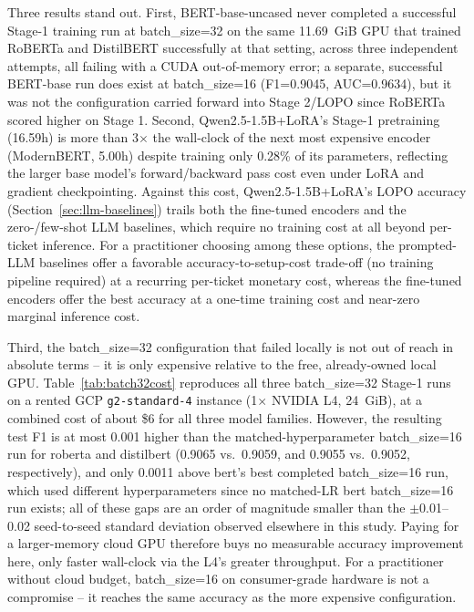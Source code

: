 \documentclass[preprint,12pt]{elsarticle}
\begin{document}
Three results stand out. First, BERT-base-uncased never completed a successful Stage-1 training run at batch\_size=32 on the same 11.69~GiB GPU that trained RoBERTa and DistilBERT successfully at that setting, across three independent attempts, all failing with a CUDA out-of-memory error; a separate, successful BERT-base run does exist at batch\_size=16 (F1=0.9045, AUC=0.9634), but it was not the configuration carried forward into Stage 2/LOPO since RoBERTa scored higher on Stage 1. Second, Qwen2.5-1.5B+LoRA's Stage-1 pretraining (16.59h) is more than 3$\times$ the wall-clock of the next most expensive encoder (ModernBERT, 5.00h) despite training only 0.28\% of its parameters, reflecting the larger base model's forward/backward pass cost even under LoRA and gradient checkpointing. Against this cost, Qwen2.5-1.5B+LoRA's LOPO accuracy (Section~\ref{sec:llm-baselines}) trails both the fine-tuned encoders and the zero-/few-shot LLM baselines, which require no training cost at all beyond per-ticket inference. For a practitioner choosing among these options, the prompted-LLM baselines offer a favorable accuracy-to-setup-cost trade-off (no training pipeline required) at a recurring per-ticket monetary cost, whereas the fine-tuned encoders offer the best accuracy at a one-time training cost and near-zero marginal inference cost.

Third, the batch\_size=32 configuration that failed locally is not out of reach in absolute terms -- it is only expensive relative to the free, already-owned local GPU. Table~\ref{tab:batch32cost} reproduces all three batch\_size=32 Stage-1 runs on a rented GCP \texttt{g2-standard-4} instance (1$\times$ NVIDIA L4, 24~GiB), at a combined cost of about \$6 for all three model families. However, the resulting test F1 is at most 0.001 higher than the matched-hyperparameter batch\_size=16 run for roberta and distilbert (0.9065 vs.\ 0.9059, and 0.9055 vs.\ 0.9052, respectively), and only 0.0011 above bert's best completed batch\_size=16 run, which used different hyperparameters since no matched-LR bert batch\_size=16 run exists; all of these gaps are an order of magnitude smaller than the $\pm$0.01--0.02 seed-to-seed standard deviation observed elsewhere in this study. Paying for a larger-memory cloud GPU therefore buys no measurable accuracy improvement here, only faster wall-clock via the L4's greater throughput. For a practitioner without cloud budget, batch\_size=16 on consumer-grade hardware is not a compromise -- it reaches the same accuracy as the more expensive configuration.
\end{document}
